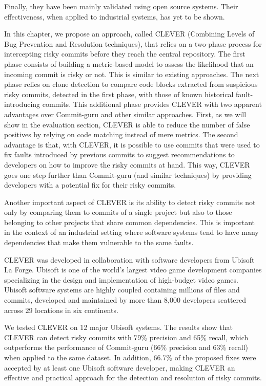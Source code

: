 \documentclass[12pt]{report}
\begin{document}
Finally, they have been mainly validated using open source systems.
Their effectiveness, when applied to industrial systems, has yet to be
shown.

In this chapter, we propose an approach, called CLEVER (Combining Levels
of Bug Prevention and Resolution techniques), that relies on a two-phase
process for intercepting risky commits before they reach the central
repository. The first phase consists of building a metric-based model to
assess the likelihood that an incoming commit is risky or not. This is
similar to existing approaches. The next phase relies on clone detection
to compare code blocks extracted from suspicious risky commits, detected
in the first phase, with those of known historical fault-introducing
commits. This additional phase provides CLEVER with two apparent
advantages over Commit-guru and other similar approaches. First, as we
will show in the evaluation section, CLEVER is able to reduce the number
of false positives by relying on code matching instead of mere metrics.
The second advantage is that, with CLEVER, it is possible to use commits
that were used to fix faults introduced by previous commits to suggest
recommendations to developers on how to improve the risky commits at
hand. This way, CLEVER goes one step further than Commit-guru (and
similar techniques) by providing developers with a potential fix for
their risky commits.

Another important aspect of CLEVER is its ability to detect risky
commits not only by comparing them to commits of a single project but
also to those belonging to other projects that share common
dependencies. This is important in the context of an industrial setting
where software systems tend to have many dependencies that make them
vulnerable to the same faults.

CLEVER was developed in collaboration with software developers from
Ubisoft La Forge. Ubisoft is one of the world's largest video game
development companies specializing in the design and implementation of
high-budget video games. Ubisoft software systems are highly coupled
containing millions of files and commits, developed and maintained by
more than 8,000 developers scattered across 29 locations in six
continents.

We tested CLEVER on 12 major Ubisoft systems. The results show that
CLEVER can detect risky commits with 79\% precision and 65\% recall,
which outperforms the performance of Commit-guru (66\% precision and
63\% recall) when applied to the same dataset. In addition, 66.7\% of
the proposed fixes were accepted by at least one Ubisoft software
developer, making CLEVER an effective and practical approach for the
detection and resolution of risky commits.
\end{document}
